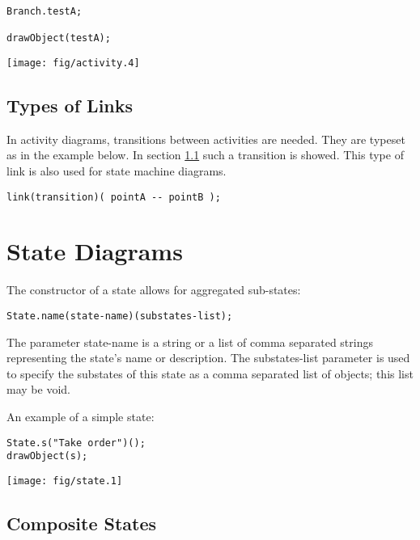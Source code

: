 \documentclass{article}
\newcommand{\code}{\ttfamily}
\begin{document}
\begin{multicols}{2}
\begin{verbatim}
Branch.testA;

drawObject(testA);
\end{verbatim}
\columnbreak
\hspace{1cm}\texttt{[image: fig/activity.4]}
\end{multicols}


\subsection{Types of Links}

In activity diagrams, transitions between activities are needed. They are typeset
as in the example below. In section \ref{composite-states} such a transition
is showed. This type of link is also used for state machine diagrams.

\begin{verbatim}
link(transition)( pointA -- pointB );
\end{verbatim}

\section{State Diagrams}

The constructor of a state allows for aggregated sub-states:

\begin{verbatim}
State.name(state-name)(substates-list);
\end{verbatim}

The parameter {\code state-name} is a string or a list of comma separated strings representing
the state's name or description. The {\code substates-list} parameter is used to specify
the substates of this state as a comma separated list of objects; this list may be void.

An example of a simple state:

\begin{multicols}{2}
\begin{verbatim}
State.s("Take order")();
drawObject(s);
\end{verbatim}
\columnbreak
\hspace{1cm}\texttt{[image: fig/state.1]}
\end{multicols}


\subsection{Composite States}
\label{composite-states}
\end{document}
